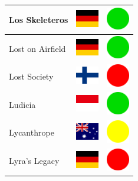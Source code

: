 \documentclass[12pt, a4paper, twoside]{report}
\begin{document}
\begin{center}
\begin{longtable}{|p{5cm}|p{2cm}|p{2cm}|}
 Los Skeleteros                                             & \includegraphics[width=1cm]{../4x3/de} &   \includegraphics[width=1cm]{../likes/y} \\ \hline
 Lost on Airfield                                           & \includegraphics[width=1cm]{../4x3/de} &   \includegraphics[width=1cm]{../likes/y} \\ \hline
 Lost Society                                               & \includegraphics[width=1cm]{../4x3/fi} &   \includegraphics[width=1cm]{../likes/n} \\ \hline
 Ludicia                                                    & \includegraphics[width=1cm]{../4x3/id} &   \includegraphics[width=1cm]{../likes/y} \\ \hline
 Lycanthrope                                                & \includegraphics[width=1cm]{../4x3/au} &   \includegraphics[width=1cm]{../likes/m} \\ \hline
 Lyra's Legacy                                              & \includegraphics[width=1cm]{../4x3/de} &   \includegraphics[width=1cm]{../likes/n} \\ \hline

\end{longtable}
\end{center}
\end{document}
